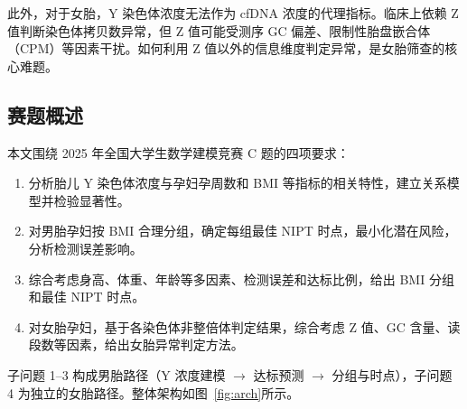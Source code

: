 \documentclass{mcm-paper}
\begin{document}
此外，对于女胎，Y 染色体浓度无法作为 cfDNA 浓度的代理指标。临床上依赖 Z 值判断染色体拷贝数异常，但 Z 值可能受测序 GC 偏差、限制性胎盘嵌合体（CPM）\cite{grati2014}等因素干扰。如何利用 Z 值以外的信息维度判定异常，是女胎筛查的核心难题。

\subsection{赛题概述}

本文围绕 2025 年全国大学生数学建模竞赛 C 题的四项要求：

\begin{enumerate}
    \item 分析胎儿 Y 染色体浓度与孕妇孕周数和 BMI 等指标的相关特性，建立关系模型并检验显著性。
    \item 对男胎孕妇按 BMI 合理分组，确定每组最佳 NIPT 时点，最小化潜在风险，分析检测误差影响。
    \item 综合考虑身高、体重、年龄等多因素、检测误差和达标比例，给出 BMI 分组和最佳 NIPT 时点。
    \item 对女胎孕妇，基于各染色体非整倍体判定结果，综合考虑 Z 值、GC 含量、读段数等因素，给出女胎异常判定方法。
\end{enumerate}

子问题 1--3 构成男胎路径（Y 浓度建模 $\to$ 达标预测 $\to$ 分组与时点），子问题 4 为独立的女胎路径。整体架构如图~\ref{fig:arch}所示。
\end{document}
